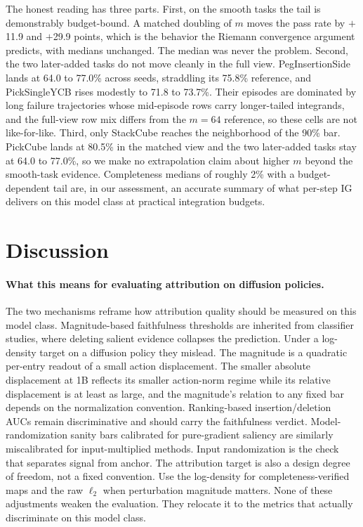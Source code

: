 \documentclass{article}
\begin{document}
The honest reading has three parts.
First, on the smooth tasks the tail is demonstrably budget-bound.
A matched doubling of $m$ moves the pass rate by $+$11.9 and $+$29.9 points, which is the behavior the Riemann convergence argument predicts, with medians unchanged.
The median was never the problem.
Second, the two later-added tasks do not move cleanly in the full view.
PegInsertionSide lands at 64.0 to 77.0\% across seeds, straddling its 75.8\% reference, and PickSingleYCB rises modestly to 71.8 to 73.7\%.
Their episodes are dominated by long failure trajectories whose mid-episode rows carry longer-tailed integrands, and the full-view row mix differs from the $m{=}64$ reference, so these cells are not like-for-like.
Third, only StackCube reaches the neighborhood of the 90\% bar.
PickCube lands at 80.5\% in the matched view and the two later-added tasks stay at 64.0 to 77.0\%, so we make no extrapolation claim about higher $m$ beyond the smooth-task evidence.
Completeness medians of roughly 2\% with a budget-dependent tail are, in our assessment, an accurate summary of what per-step IG delivers on this model class at practical integration budgets.

\FloatBarrier
\section{Discussion}

\paragraph{What this means for evaluating attribution on diffusion policies.}
The two mechanisms reframe how attribution quality should be measured on this model class.
Magnitude-based faithfulness thresholds are inherited from classifier studies, where deleting salient evidence collapses the prediction.
Under a log-density target on a diffusion policy they mislead.
The magnitude is a quadratic per-entry readout of a small action displacement.
The smaller absolute displacement at 1B reflects its smaller action-norm regime while its relative displacement is at least as large, and the magnitude's relation to any fixed bar depends on the normalization convention.
Ranking-based insertion/deletion AUCs remain discriminative and should carry the faithfulness verdict.
Model-randomization sanity bars calibrated for pure-gradient saliency are similarly miscalibrated for input-multiplied methods.
Input randomization is the check that separates signal from anchor.
The attribution target is also a design degree of freedom, not a fixed convention.
Use the log-density for completeness-verified maps and the raw $\ell_2$ when perturbation magnitude matters.
None of these adjustments weaken the evaluation.
They relocate it to the metrics that actually discriminate on this model class.
\end{document}
